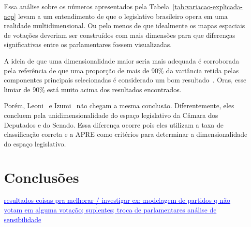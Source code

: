 \documentclass[a4paper, 12pt]{article}
\newcommand{\ins}[1]{\textcolor{blue}{\uline{#1}}} %
\begin{document}
Essa análise sobre os números apresentados pela Tabela~\ref{tab:variacao-explicada-acp} levam a um entendimento de que o legislativo brasileiro opera em uma realidade multidimensional. Ou pelo menos de que idealmente os mapas espaciais de votações deveriam ser construídos com mais dimensões para que diferenças significativas entre os parlamentares fossem visualizadas. 

A ideia de que uma dimensionalidade maior seria mais adequada é corroborada pela referência de que uma proporção de mais de 90\% da variância retida pelas componentes principais selecionadas é considerado um bom resultado~\cite{DataMining2003}. Oras, esse limiar de 90\% está muito acima dos resultados encontrados.

Porém, Leoni~\cite{leoni02cdep} e Izumi~\cite{izumi2016senado} não chegam a mesma conclusão. Diferentemente, eles concluem pela unidimensionalidade do espaço legislativo da Câmara dos Deputados e do Senado. Essa diferença ocorre pois eles utilizam a taxa de classificação correta e a APRE como critérios para determinar a dimensionalidade do espaço legislativo.

\section{Conclusões}
\label{sec:conclusoes}

\ins{resultados
 coisas pra melhorar / investigar
 ex: modelagem de partidos q não votam em alguma votação; suplentes; troca de parlamentares análise de sensibilidade }


{}

 
\end{document}
